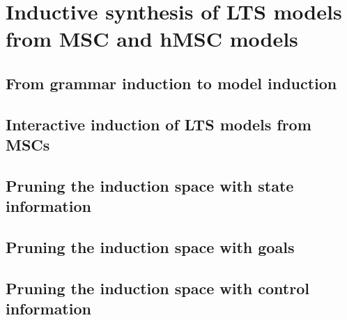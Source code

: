 \chapter{Inductive synthesis of LTS models from MSC and hMSC models}

\section{From grammar induction to model induction}
\section{Interactive induction of LTS models from MSCs}
\section{Pruning the induction space with state information}
\section{Pruning the induction space with goals}
\section{Pruning the induction space with control information}
